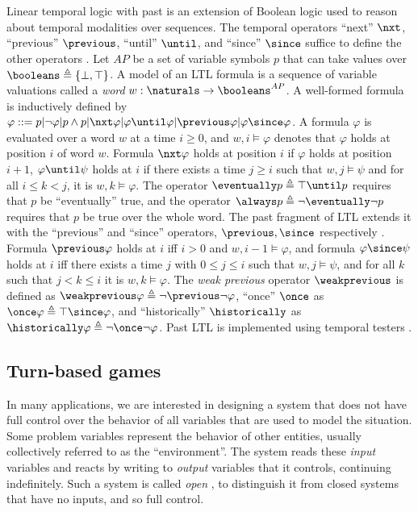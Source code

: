\documentclass[copyright]{eptcs}
\begin{document}
Linear temporal logic with past is an extension of Boolean logic used to reason about temporal modalities over sequences.
The temporal operators “next” $\nxt$, “previous” $\previous$, “until” $\until$, and “since” $\since$ suffice to define the other operators \cite{Pnueli77,Baier08}.
Let $AP$ be a set of variable symbols $p$ that can take values over $\booleans\triangleq\{\bot, \top\}$.
A model of an LTL formula is a sequence of variable valuations called a {\em word} $w: \naturals \rightarrow \booleans^{AP}$.
A well-formed formula is inductively defined by
$\varphi ::= p | \neg \varphi | p \wedge p | \nxt \varphi | \varphi \until \varphi | \previous \varphi | \varphi \since \varphi$.
A formula $\varphi$ is evaluated over a word $w$ at a time $i \geq 0$, and $w, i \models \varphi$ denotes that $\varphi$ holds at position $i$ of word $w$.
Formula $\nxt \varphi$ holds at position $i$ if $\varphi$ holds at position $i + 1$,
$\varphi \until \psi$ holds at $i$ if there exists a time $j \geq i$ such that $w, j \models \psi$ and for all $i \leq k < j$, it is $w, k \models \varphi$.
The operator $\eventually p \triangleq \top \until p$ requires that $p$ be “eventually” true, and the operator $\always p \triangleq \neg \eventually \neg p$ requires that $p$ be true over the whole word.
The past fragment of LTL extends it with the “previous” and “since” operators, $\previous, \since$ respectively \cite{Lichtenstein85clp,Manna89lncs,Kesten1998icalp}.
Formula $\previous \varphi$ holds at $i$ iff $i > 0$ and $w, i-1 \models \varphi$, and
formula $\varphi \since \psi$ holds at $i$ iff there exists a time $j$ with $0 \leq j \leq i$ such that $w, j \models \psi$, and for all $k$ such that $j < k \leq i$ it is $w, k \models \varphi$.
The {\em weak previous} operator $\weakprevious$ is defined as $\weakprevious \varphi \triangleq \neg \previous \neg \varphi$,
“once” $\once$ as $\once \varphi \triangleq \top \since \varphi$, and
“historically” $\historically$ as $\historically \varphi \triangleq \neg \once \neg \varphi$.
Past LTL is implemented using temporal testers \cite{Kesten1998icalp}.


\subsection{Turn-based games}

In many applications, we are interested in designing a system that does not have full control over the behavior of all variables that are used to model the situation.
Some problem variables represent the behavior of other entities, usually collectively referred to as the “environment”.
The system reads these {\em input} variables and reacts by writing to {\em output} variables that it controls, continuing indefinitely.
Such a system is called {\em open} \cite{Abadi94podc,Pnueli89popl}, to distinguish it from closed systems that have no inputs, and so full control.
\end{document}
